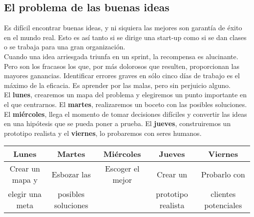 \documentclass[10pt]{article}
\begin{document}
\subsection*{El problema de las buenas ideas}
Es difícil encontrar buenas ideas, y ni siquiera las mejores son garantía de éxito en el mundo real. Esto es así tanto si se dirige una start-up como si se dan clases o se trabaja para una gran organización.\\
Cuando una idea arriesgada triunfa en un sprint, la recompensa es alucinante. Pero son los fracasos los que, por más dolorosos que resulten, proporcionan las mayores ganancias. Identificar errores graves en sólo cinco días de trabajo es el máximo de la eficacia. Es aprender por las malas, pero sin perjuicio alguno.\\
El \textbf{lunes}, crearemos un mapa del problema y elegiremos un punto importante en el que centrarnos. El \textbf{martes}, realizaremos un boceto con las posibles soluciones. El \textbf{miércoles}, llega el momento de tomar decisiones difíciles y convertir las ideas en una hipótesis que se pueda poner a prueba. El \textbf{jueves}, construiremos un prototipo realista y el \textbf{viernes}, lo probaremos con seres humanos.
\begin{center}
\begin{tabular}{c c c c c}
Lunes&Martes&Miércoles&Jueves&Viernes\\
\hline
Crear un mapa y&Esbozar las &Escoger el mejor&Crear un &Probarlo con \\
 elegir una meta&posibles soluciones&&prototipo realista&clientes potenciales\\
\end{tabular}
\end{center}
\end{document}
